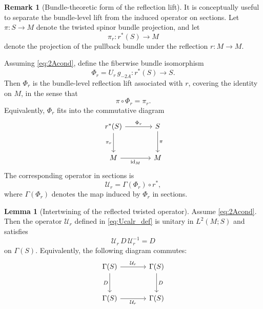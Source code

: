 \documentclass[11pt]{article}
\theoremstyle{definition}
\newtheorem{lemma}[theorem]{Lemma}
\newtheorem{remark}[remark]{Remark}
\numberwithin{equation}{section}
\begin{document}
\begin{remark}[Bundle-theoretic form of the reflection lift]
It is conceptually useful to separate the bundle-level lift from the induced operator on sections. Let \(\pi:S \to M\) denote the twisted spinor bundle projection, and let
\begin{equation}\label{eq:bundle_projection_pir}
\pi_r:r^*(S)\longrightarrow M
\end{equation}
denote the projection of the pullback bundle under the reflection \(r:M\to M\).

Assuming \eqref{eq:2Acond}, define the fiberwise bundle isomorphism
\begin{equation}\label{eq:Phi_r_def}
\Phi_r=U_r\,g_{-2A}:r^*(S)\longrightarrow S.
\end{equation}
Then \(\Phi_r\) is the bundle-level reflection lift associated with \(r\), covering the identity on \(M\), in the sense that
\begin{equation}\label{eq:Phi_r_covers_id}
\pi\circ \Phi_r=\pi_r.
\end{equation}
Equivalently, \(\Phi_r\) fits into the commutative diagram
\begin{equation}
\begin{tikzcd}[column sep=large,row sep=large]
r^*(S) \arrow[r,"\Phi_r"] \arrow[d,"\pi_r"'] &
S \arrow[d,"\pi"] \\
M \arrow[r,"\text{id}_M"'] & M
\end{tikzcd}
\end{equation}
The corresponding operator in sections is
\begin{equation}\label{eq:Ucalr_from_Phi}
\mathcal U_r=\Gamma(\Phi_r)\circ r^*,
\end{equation}
where \(\Gamma(\Phi_r)\) denotes the map induced by \(\Phi_r\) in sections.
\end{remark}



\begin{lemma}[Intertwining of the reflected twisted operator]
\label{lem:reflection_intertwining}
Assume \eqref{eq:2Acond}. Then the operator \(\mathcal U_r\) defined in \eqref{eq:Ucalr_def}
is unitary in \(L^2(M;S)\) and satisfies
\begin{equation}\label{eq:Ucalr_intertwine}
\mathcal U_r\,D\,\mathcal U_r^{-1}=D
\end{equation}
on \(\Gamma(S)\). Equivalently, the following diagram commutes:
\begin{equation}
\begin{tikzcd}[column sep=large,row sep=large]
\Gamma(S) \arrow[r,"\mathcal U_r"] \arrow[d,"D"'] &
\Gamma(S) \arrow[d,"D"] \\
\Gamma(S) \arrow[r,"\mathcal U_r"'] &
\Gamma(S)
\end{tikzcd}
\end{equation}
\end{lemma}
\end{document}
